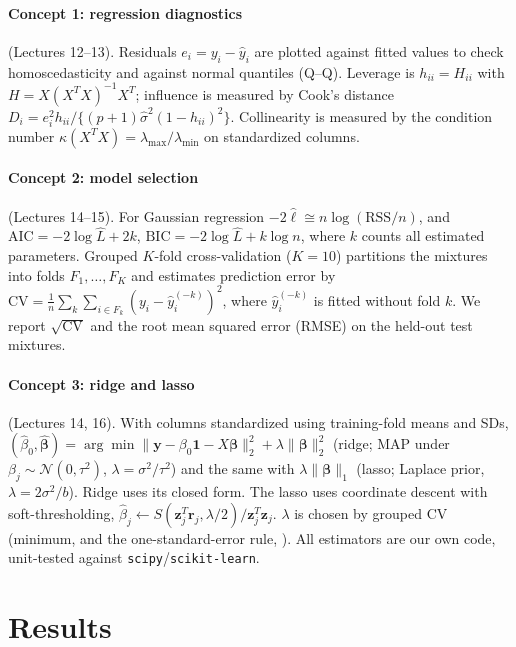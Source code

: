 \documentclass[11pt]{article}
\begin{document}
\paragraph{Concept 1: regression diagnostics} (Lectures 12--13). Residuals $e_i=y_i-\hat y_i$ are plotted against fitted values to check homoscedasticity and against normal quantiles (Q--Q). Leverage is $h_{ii}=H_{ii}$ with $H=X(X^TX)^{-1}X^T$; influence is measured by Cook's distance $D_i=e_i^2h_{ii}/\{(p+1)\hat\sigma^2(1-h_{ii})^2\}$. Collinearity is measured by the condition number $\kappa(X^TX)=\lambda_{\max}/\lambda_{\min}$ on standardized columns.

\paragraph{Concept 2: model selection} (Lectures 14--15). For Gaussian regression $-2\hat\ell\cong n\log(\mathrm{RSS}/n)$, and $\mathrm{AIC}=-2\log\hat L+2k$, $\mathrm{BIC}=-2\log\hat L+k\log n$, where $k$ counts all estimated parameters. Grouped $K$-fold cross-validation ($K=10$) partitions the mixtures into folds $F_1,\dots,F_K$ and estimates prediction error by $\mathrm{CV}=\frac1n\sum_{k}\sum_{i\in F_k}(y_i-\hat y_i^{(-k)})^2$, where $\hat y_i^{(-k)}$ is fitted without fold $k$. We report $\sqrt{\mathrm{CV}}$ and the root mean squared error (RMSE) on the held-out test mixtures.

\paragraph{Concept 3: ridge and lasso} (Lectures 14, 16). With columns standardized using training-fold means and SDs,
$(\hat\beta_0,\hat{\bm\beta})=\arg\min\|\mathbf y-\beta_0\mathbf 1-X\bm\beta\|_2^2+\lambda\|\bm\beta\|_2^2$ (ridge; MAP under $\beta_j\sim\mathcal N(0,\tau^2)$, $\lambda=\sigma^2/\tau^2$) and the same with $\lambda\|\bm\beta\|_1$ (lasso; Laplace prior, $\lambda=2\sigma^2/b$). Ridge uses its closed form. The lasso uses coordinate descent with soft-thresholding, $\hat\beta_j\leftarrow S(\mathbf z_j^T\mathbf r_j,\lambda/2)/\mathbf z_j^T\mathbf z_j$. $\lambda$ is chosen by grouped CV (minimum, and the one-standard-error rule, \citealp{hastie2009}). All estimators are our own code, unit-tested against \texttt{scipy}/\texttt{scikit-learn}.

\section{Results}
\end{document}
